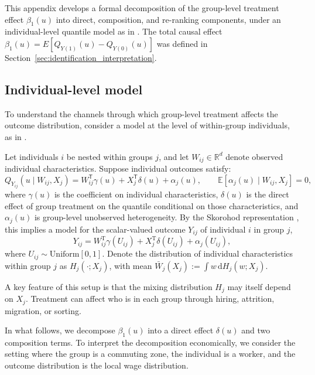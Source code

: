\documentclass[12pt]{article}
\newcommand{\E}{\mathbb{E}}
\newcommand{\T}{\mathsf{T}} %
\newcommand{\dd}{\mathrm{d}} %
\begin{document}
This appendix develops a formal decomposition of the group-level treatment effect $\beta_1(u)$ into direct, composition, and re-ranking components, under an individual-level quantile model as in \citet{chetverikov2016iv}. The total causal effect $\beta_1(u) = E[Q_{Y(1)}(u) - Q_{Y(0)}(u)]$ was defined in Section~\ref{sec:identification_interpretation}.

\subsection{Individual-level model}

To understand the channels through which group-level treatment affects the outcome distribution, consider a model at the level of within-group individuals, as in \citet{chetverikov2016iv}.

Let individuals $i$ be nested within groups $j$, and let $W_{ij} \in \mathbb{R}^d$ denote observed individual characteristics. Suppose individual outcomes satisfy:
\begin{equation}\label{eq:micro}
 Q_{Y_{ij}}(u \mid W_{ij}, X_j) = W_{ij}^{\T} \gamma(u) + X_j^{\T} \delta(u) + \alpha_j(u), \qquad \E[\alpha_j(u) \mid W_{ij}, X_j] = 0,
\end{equation}
where $\gamma(u)$ is the coefficient on individual characteristics, $\delta(u)$ is the direct effect of group treatment on the quantile conditional on those characteristics, and $\alpha_j(u)$ is group-level unobserved heterogeneity. By the Skorohod representation \citep{skorokhod1956limit}, this implies a model for the scalar-valued outcome $Y_{ij}$ of individual $i$ in group $j$,
\begin{equation} \label{eq:skorohod}
Y_{i j}=W_{i j}^{\mathrm{T}} \gamma\left(U_{i j}\right)+X_j^{\mathrm{T}} \delta\left(U_{i j}\right)+\alpha_j\left(U_{i j}\right),
\end{equation}
where $U_{ij} \sim \mathrm{Uniform}[0,1]$.
Denote the distribution of individual characteristics within group $j$ as $H_j(\cdot; X_j)$, with mean $\bar{W}_j(X_j) := \int w \, \dd H_j(w; X_j)$.

A key feature of this setup is that the mixing distribution $H_j$ may itself depend on $X_j$. Treatment can affect who is in each group through hiring, attrition, migration, or sorting.

In what follows, we decompose $\beta_1(u)$ into a direct effect $\delta(u)$ and two composition terms. To interpret the decomposition economically, we consider the setting where the group is a commuting zone, the individual is a worker, and the outcome distribution is the local wage distribution.
\end{document}
